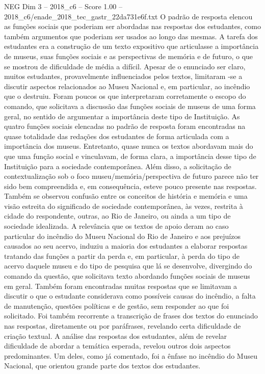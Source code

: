 \begin{textsample}{NEG Dim 3 – 2018\_c6 – Score 1.00 – 2018\_c6/enade\_2018\_tec\_gastr\_22da731e6f.txt}
O padrão de resposta elencou as funções sociais que poderiam ser abordadas nas respostas dos estudantes, como também argumentos que poderiam ser usados ao longo das mesmas.
A tarefa dos estudantes era a construção de um texto expositivo que articulasse a importância de museus, suas funções sociais e as perspectivas de memória e de futuro, o que se mostrou de dificuldade de média a difícil.
Apesar de o enunciado ser claro, muitos estudantes, provavelmente influenciados pelos textos, limitaram -se a discutir aspectos relacionados ao Museu Nacional e, em particular, ao incêndio que o destruiu.
Foram poucos os que interpretaram corretamente o escopo do comando, que solicitava a discussão das funções sociais de museus de uma forma geral, no sentido de argumentar a importância deste tipo de Instituição.
As quatro funções sociais elencadas no padrão de resposta foram encontradas na quase totalidade das redações dos estudantes de forma articulada com a importância dos museus.
Entretanto, quase nunca os textos abordavam mais do que uma função social e vinculavam, de forma clara, a importância desse tipo de Instituição para a sociedade contemporânea.
Além disso, a solicitação de contextualização sob o foco museu/memória/perspectiva de futuro parece não ter sido bem compreendida e, em consequência, esteve pouco presente nas respostas.
Também se observou confusão entre os conceitos de história e memória e uma visão estreita do significado de sociedade contemporânea, às vezes, restrita à cidade do respondente, outras, ao Rio de Janeiro, ou ainda a um tipo de sociedade idealizada.
A relevância que os textos de apoio deram ao caso particular do incêndio do Museu Nacional do Rio de Janeiro e aos prejuízos causados ao seu acervo, induziu a maioria dos estudantes a elaborar respostas tratando das funções a partir da perda e, em particular, à perda do tipo de acervo daquele museu e do tipo de pesquisa que lá se desenvolve, divergindo do comando da questão, que solicitava texto abordando funções sociais de museus em geral.
Também foram encontradas muitas respostas que se limitavam a discutir o que o estudante considerava como possíveis causas do incêndio, a falta de manutenção, questões políticas e de gestão, sem responder ao que foi solicitado.
Foi também recorrente a transcrição de frases dos textos do enunciado nas respostas, diretamente ou por paráfrases, revelando certa dificuldade de criação textual.
A análise das respostas dos estudantes, além de revelar dificuldade de abordar a temática esperada, revelou outros dois aspectos predominantes.
Um deles, como já comentado, foi a ênfase no incêndio do Museu Nacional, que orientou grande parte dos textos dos estudantes.

\end{textsample}
